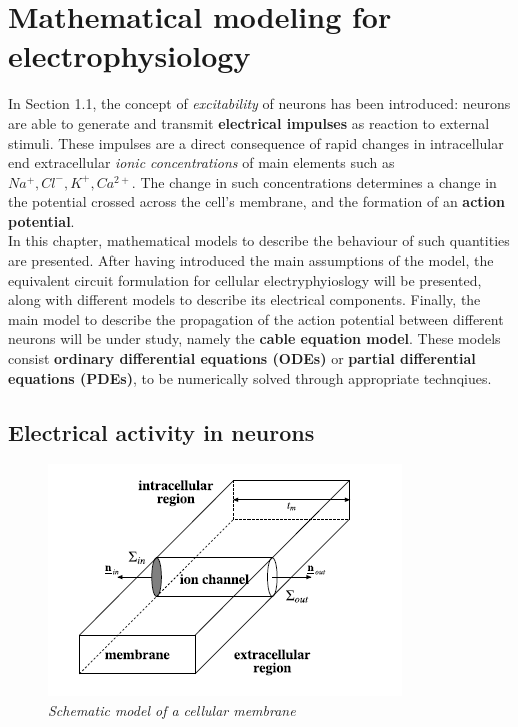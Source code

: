 \documentclass[a4paper]{article}
\begin{document}
\section{Mathematical modeling for electrophysiology}

In Section 1.1, the concept of \textit{excitability} of neurons has been introduced: neurons are able to generate and transmit \textbf{electrical impulses} as reaction to external stimuli. These impulses are a direct consequence of rapid changes in intracellular end extracellular \textit{ionic concentrations} of main elements such as $Na^+, Cl^-, K^+, Ca^{2+}$. The change in such concentrations determines a change in the potential crossed across the cell's membrane, and the formation of an \textbf{action potential}. \\
In this chapter, mathematical models to describe the behaviour of such quantities are presented. After having introduced the main assumptions of the model, the equivalent circuit formulation for cellular electryphyioslogy will be presented, along with different models to describe its electrical components. Finally, the main model to describe the propagation of the action potential between different neurons will be under study, namely the \textbf{cable equation model}. These models consist \textbf{ordinary differential equations (ODEs)} or \textbf{partial differential equations (PDEs)}, to be numerically solved through appropriate technqiues.

\subsection{Electrical activity in neurons}

\begin{figure}[H]
	\begin{center}
		\includegraphics[scale=0.77]{intra.png} 
	\end{center} 
	\caption{\textit{Schematic model of a cellular membrane}}
	
\end{figure}
\end{document}
